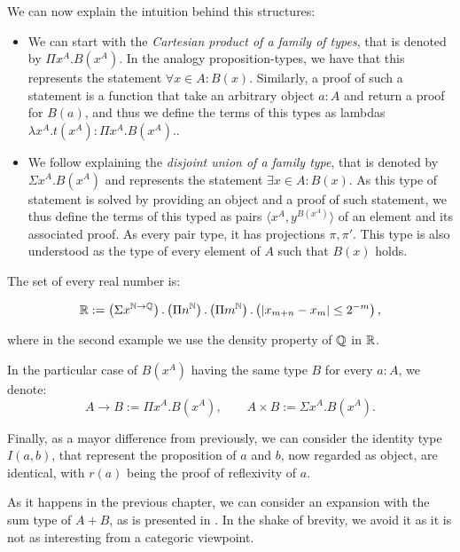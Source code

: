 We can now explain the intuition behind this structures:

\begin{itemize}
\item We can start with the \emph{Cartesian product of a family of types}, that is denoted by $\Pi x^A. B(x^A)$. In the analogy proposition-types, we have that this represents the statement $\forall x \in A : B(x)$. Similarly, a proof of such a statement is a function that take an arbitrary object $a:A$ and return a proof for $B(a)$, and thus we define the terms of this types as lambdas $\lambda x^A.t(x^A) : \Pi x^A. B(x^A).$.\\


\item We follow explaining the \emph{disjoint union of a family type}, that is denoted by $\Sigma x^A. B(x^A)$ and represents the statement $\exists x \in A : B(x)$. As this type of statement is solved by providing an object and a proof of such statement, we thus define the terms of this typed as pairs $\langle x^A, y^{B(x^A)}\rangle$ of an element and its associated proof. As every pair type, it has projections $\pi,\pi'$. This type is also understood as the type of every element of $A$ such that $B(x)$ holds.
\end{itemize}
\begin{example}
  The set of every real number is:

  $$\mathbb{R} := \left(\Sigma x^{\mathbb{N}\to\mathbb{Q}}\right).\left(\Pi n^{\mathbb{N}}\right).\left(\Pi m^{\mathbb{N}}\right).\left(|x_{m+n} - x_m| \le 2^{-m}\right),$$
  
  where in the second example we use the density property of $\mathbb{Q}$ in $\mathbb{R}$.\\
\end{example}

In the particular case of $B(x^A)$ having the same type $B$ for every $a:A$, we denote:
$$A\to B:= \Pi x^A. B(x^A),\qquad A\times B := \Sigma x^A. B(x^A).$$

Finally, as a mayor difference from previously, we can consider the identity type $I(a,b)$, that represent the proposition of $a$ and $b$, now regarded as object, are identical, with $r(a)$ being the proof of reflexivity of $a$. 


\begin{remark}
  As it happens in the previous chapter, we can consider an expansion with the sum type of $A+B$, as is presented in \cite[Section 1.6]{martinlof1973intuitionistic}. In the shake of brevity, we avoid it as it is not as interesting from a categoric viewpoint.
\end{remark}


